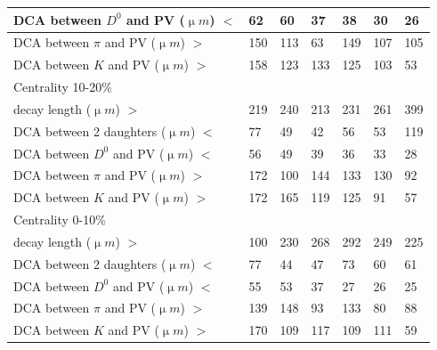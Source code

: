 \begin{table}[htp]
\begin{center}
\begin{tabular}{l|l|l|l|l|l|l}
      DCA between $D^0$ and PV (${\upmu}m$) $<$ & 62 & 60 & 37 & 38 & 30 & 26\\ \hline
      DCA between $\pi$ and PV (${\upmu}m$) $>$ & 150 & 113 & 63 & 149 & 107 & 105\\ \hline
      DCA between $K$ and PV (${\upmu}m$) $>$ & 158 & 123 & 133 & 125 & 103 & 53\\ \hline
      Centrality  10-20\% &  &  &  &  & & \\ \hline
      decay length (${\upmu}m$) $>$ & 219 & 240 & 213 & 231 & 261 & 399\\ \hline
      DCA between 2 daughters (${\upmu}m$) $<$ & 77 & 49 & 42 & 56 & 53 & 119\\ \hline
      DCA between $D^0$ and PV (${\upmu}m$) $<$ & 56 & 49 & 39 & 36 & 33 & 28\\ \hline
      DCA between $\pi$ and PV (${\upmu}m$) $>$ & 172 & 100 & 144 & 133 & 130 & 92\\ \hline
      DCA between $K$ and PV (${\upmu}m$) $>$ & 172 & 165 & 119 & 125 & 91 & 57\\ \hline
      Centrality  0-10\% &  &  &  &  & & \\ \hline
      decay length (${\upmu}m$) $>$ & 100 & 230 & 268 & 292 & 249 & 225\\ \hline
      DCA between 2 daughters (${\upmu}m$) $<$ & 77 & 44 & 47 & 73 & 60 & 61\\ \hline
      DCA between $D^0$ and PV (${\upmu}m$) $<$ & 55 & 53 & 37 & 27 & 26 & 25\\ \hline
      DCA between $\pi$ and PV (${\upmu}m$) $>$ & 139 & 148 & 93 & 133 & 80 & 88\\ \hline
      DCA between $K$ and PV (${\upmu}m$) $>$ & 170 & 109 & 117 & 109 & 111 & 59\\ \hline
    \end{tabular}
  \end{center}
\end{table}

